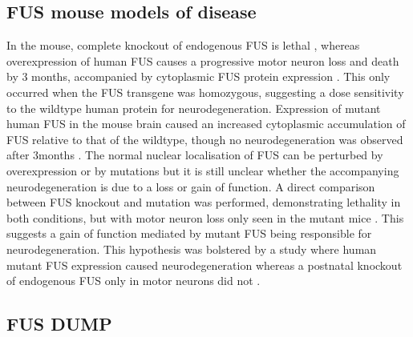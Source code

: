 \subsection{ FUS mouse models of disease } 

In the mouse, complete knockout of endogenous FUS is lethal \citep{Hicks2000}, whereas overexpression of human FUS causes a progressive motor neuron loss and death by 3 months, accompanied by cytoplasmic FUS protein expression \citep{Mitchell2013}. This only occurred when the FUS transgene was homozygous, suggesting a dose sensitivity to the wildtype human protein for neurodegeneration. Expression of mutant human FUS in the mouse brain caused an increased cytoplasmic accumulation of FUS relative to that of the wildtype, though no neurodegeneration was observed after 3months \citep{Verbeeck2012}. 
The normal nuclear localisation of FUS can be perturbed by overexpression or by mutations but it is still unclear whether the accompanying neurodegeneration is due to a loss or gain of function. A direct comparison between FUS knockout and mutation was performed, demonstrating lethality in both conditions, but with motor neuron loss only seen in the mutant mice \citep{Scekic-zahirovic2016}. This suggests a gain of function mediated by mutant FUS being responsible for neurodegeneration. This hypothesis was bolstered by a study where human mutant FUS expression caused neurodegeneration whereas a postnatal knockout of endogenous FUS only in motor neurons did not \citep{Sharma2016}. 


\subsection{FUS DUMP}

